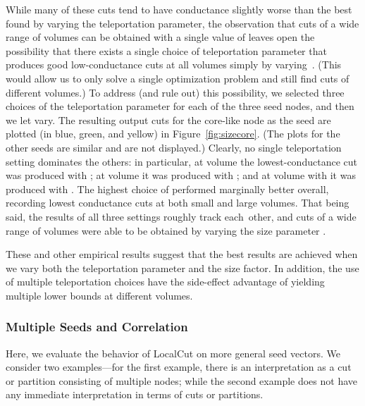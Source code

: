 \documentclass[11pt]{article}
\begin{document}
While many of these cuts tend to have conductance slightly worse than the 
best found by varying the teleportation parameter, the observation that cuts 
of a wide range of volumes can be obtained with a single value of  
leaves open the possibility that there exists a single choice of 
teleportation parameter  that produces good low-conductance cuts at 
all volumes simply by varying~. 
(This would allow us to only solve a single optimization problem and still 
find cuts of different volumes.)
To address (and rule out) this possibility, we selected three choices of 
the teleportation parameter for each of the three seed nodes, and then we 
let  vary. 
The resulting output cuts for the core-like node as the seed are plotted 
(in blue, green, and yellow) in Figure~\ref{fig:sizecore}. 
(The plots for the other seeds are similar and are not displayed.)
Clearly, no single teleportation setting dominates the others: in 
particular, at volume  the lowest-conductance cut was produced with 
; at volume  it was produced with ; and at 
volume  with it was produced with . 
The highest choice of  performed marginally better overall, 
recording lowest conductance cuts at both small and large volumes. 
That being said, the results of all three settings roughly track each~other, 
and cuts of a wide range of volumes were able to be obtained by varying the 
size parameter .

These and other empirical results suggest that the best results are 
achieved when we vary both the teleportation parameter and the size factor. 
In addition, the use of multiple teleportation choices have the side-effect 
advantage of yielding multiple lower bounds at different volumes.


\subsubsection{Multiple Seeds and Correlation}
\label{sec:multi}

Here, we evaluate the behavior of \textsf{LocalCut} on more general seed 
vectors. 
We consider two examples---for the first example, there is an interpretation 
as a cut or partition consisting of multiple nodes; while the second example 
does not have any immediate interpretation in terms of cuts or partitions.
\end{document}
